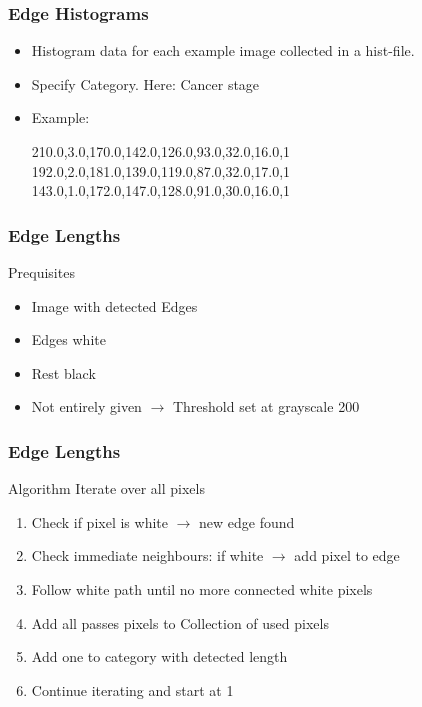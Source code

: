 \documentclass{beamer}
\begin{document}
\begin{frame}[fragile]
	\frametitle{Edge Histograms}
	\begin{itemize}
		\item Histogram data for each example image collected in a hist-file.
		\item Specify Category. Here: Cancer stage
		\item Example:\\
		\begin{verbatimtab}[1]
210.0,3.0,170.0,142.0,126.0,93.0,32.0,16.0,1
192.0,2.0,181.0,139.0,119.0,87.0,32.0,17.0,1
143.0,1.0,172.0,147.0,128.0,91.0,30.0,16.0,1
		\end{verbatimtab}
		
	\end{itemize}
	
\end{frame}

\begin{frame}
	\frametitle{Edge Lengths}
	\begin{block}{Prequisites}
		\begin{itemize}
			\item Image with detected Edges
			\item Edges white
			\item Rest black
			\item Not entirely given $\rightarrow$ Threshold set at grayscale 200
		\end{itemize}
	\end{block}
	
\end{frame}

\begin{frame}
	\frametitle{Edge Lengths}
	\begin{block}{Algorithm}
		Iterate over all pixels
		\begin{enumerate}
			\item Check if pixel is white $\rightarrow$ new edge found
			\item Check immediate neighbours: if white $\rightarrow$ add pixel to edge
			\item Follow white path until no more connected white pixels
			\item Add all passes pixels to Collection of used pixels
			\item Add one to category with detected length
			\item Continue iterating and start at 1
			
		\end{enumerate}
	\end{block}
\end{frame}
\end{document}
